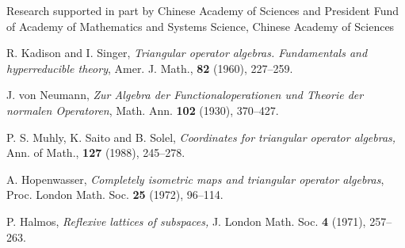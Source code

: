 \documentclass{pnastwo}
\begin{document}
\begin{article}
\begin{acknowledgments}
Research supported in part by Chinese Academy of Sciences and President Fund of 
Academy of Mathematics and Systems Science, Chinese Academy of Sciences
\end{acknowledgments}






\begin{thebibliography}{21}

 R. Kadison and I. Singer, {\em Triangular operator
algebras. Fundamentals and hyperreducible theory}, Amer. J. Math.,
    {\bf 82 } (1960),  227--259.

 J. von Neumann, {\em Zur Algebra der
Functionaloperationen und Theorie der normalen Operatoren}, Math.
Ann. {\bf 102} (1930), 370--427.

 P. S. Muhly, K. Saito and B. Solel, {\em Coordinates
for triangular operator algebras,} Ann. of Math., {\bf 127}
(1988), 245--278.

 A. Hopenwasser, {\em Completely isometric maps and
triangular operator algebras}, Proc. London Math. Soc. {\bf 25}
(1972), 96--114.

 P. Halmos, {\em Reflexive lattices of subspaces,} J.
London Math. Soc.  {\bf 4}  (1971),  257--263.


\end{thebibliography}
\end{article}
\end{document}
